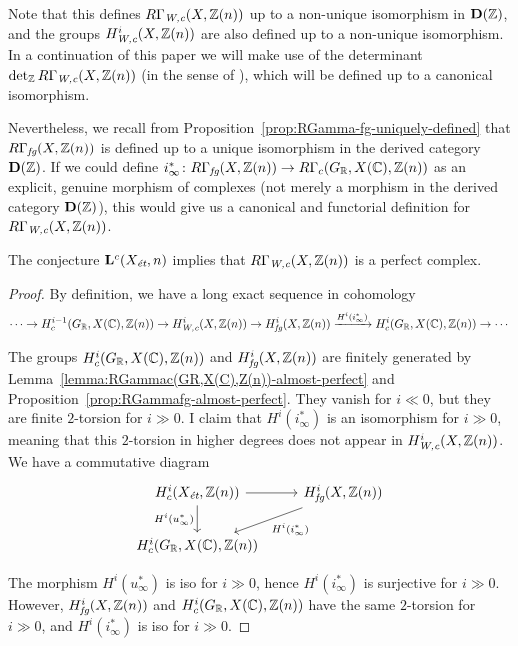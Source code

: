 \documentclass{article}
\numberwithin{equation}{section}
\begin{document}
\begin{remark}
  Note that this defines $R\Gamma_\Wc (X,\ZZ(n))$ up to a non-unique isomorphism
  in $\mathbf{D} (\ZZ)$, and the groups $H_\Wc^i (X, \ZZ (n))$ are also defined
  up to a non-unique isomorphism. In a continuation of this paper we will make
  use of the determinant $\det\nolimits_\ZZ R\Gamma_\Wc (X,\ZZ(n))$ (in the
  sense of \cite{Knudsen-Mumford-1976}), which will be defined up to a canonical
  isomorphism.

  Nevertheless, we recall from Proposition~\ref{prop:RGamma-fg-uniquely-defined}
  that $R\Gamma_\fg (X, \ZZ (n))$ is defined up to a unique isomorphism in the
  derived category $\mathbf{D} (\ZZ)$. If we could define
  $i_\infty^*\colon R\Gamma_\fg (X, \ZZ(n)) \to R\Gamma_c (G_\RR, X(\CC), \ZZ(n))$
  as an explicit, genuine morphism of complexes (not merely a morphism in the
  derived category $\mathbf{D} (\ZZ)$), this would give us a canonical and
  functorial definition for $R\Gamma_\Wc (X, \ZZ(n))$.
\end{remark}

\begin{proposition}
  \label{prop:RGammaWc-perfect}
  The conjecture $\mathbf{L}^c (X_\et, n)$ implies that $R\Gamma_\Wc (X,\ZZ(n))$
  is a perfect complex.

  \begin{proof}
    By definition, we have a long exact sequence in cohomology
    \[ \cdots \to H^{i-1}_c (G_\RR, X (\CC), \ZZ (n)) \to
    H^i_\Wc (X,\ZZ(n)) \to
    H^i_\fg (X,\ZZ(n)) \xrightarrow{H^i (i_\infty^*)}
    H^i_c (G_\RR, X (\CC), \ZZ (n)) \to \cdots \]

    The groups $H^i_c (G_\RR, X (\CC), \ZZ (n))$ and $H^i_\fg (X, \ZZ(n))$ are
    finitely generated by Lemma~\ref{lemma:RGammac(GR,X(C),Z(n))-almost-perfect}
    and Proposition~\ref{prop:RGammafg-almost-perfect}. They vanish for
    $i \ll 0$, but they are finite $2$-torsion for $i \gg 0$. I claim that
    $H^i (i_\infty^*)$ is an isomorphism for $i \gg 0$, meaning that this
    $2$-torsion in higher degrees does not appear in $H^i_\Wc (X,\ZZ(n))$.
    We have a commutative diagram
    \[ \begin{tikzcd}
      H^i_c (X_\et, \ZZ (n))\ar{r}\ar{d}[swap]{H^i (u_\infty^*)} & H^i_\fg (X, \ZZ (n))\ar{dl}{H^i (i_\infty^*)} \\
      H^i_c (G_\RR, X (\CC), \ZZ (n))
    \end{tikzcd} \]

    The morphism $H^i (u_\infty^*)$ is iso for $i \gg 0$, hence
    $H^i (i_\infty^*)$ is surjective for $i \gg 0$. However,
    $H^i_\fg (X, \ZZ (n))$ and $H^i_c (G_\RR, X (\CC), \ZZ (n))$ have the same
    $2$-torsion for $i \gg 0$, and $H^i (i_\infty^*)$ is iso for $i \gg 0$.
  \end{proof}
\end{proposition}
\end{document}
